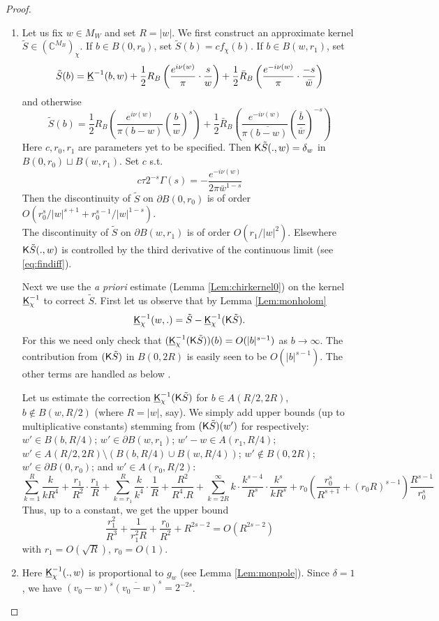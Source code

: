 \documentclass[10pt]{article}
\newcommand{\C}{\mathbb{C}}
\newcommand{\rK}{{\sf K}}
\newcommand{\uK}{{\underline {\sf K}}}
\begin{document}
\begin{proof}
\begin{enumerate}
\item
Let us fix $w\in M_W$ and set $R=|w|$. We first construct an approximate kernel $\tilde S\in(\C^{M_B})_\chi$. If $b\in B(0,r_0)$, set $\tilde S(b)=cf_\chi(b)$. If $b\in B(w,r_1)$, set 
$$\tilde S(b)=\uK^{-1}(b,w)+
\frac 12R_B\left(\frac{e^{i\nu(w)}}{\pi}\cdot\frac sw\right)+\frac 12\bar R_B\left(\frac{e^{-i\nu(w)}}{\pi}\cdot\frac{-s}{\bar w}\right)$$
and otherwise
$$\tilde S(b)=\frac 12R_B\left(\frac{e^{i\nu(w)}}{\pi(b-w)}\left(\frac bw\right)^s\right)+\frac 12\bar R_B\left(\frac{e^{-i\nu(w)}}{\pi\overline{(b-w)}}\left(\frac {\bar b}{\bar w}\right)^{-s}\right)$$
Here $c,r_0,r_1$ are parameters yet to be specified. Then $\rK \tilde S(.,w)=\delta_w$ in $B(0,r_0)\sqcup B(w,r_1)$. Set $c$ s.t.
$$c\tau 2^{-s}\Gamma(s)=-\frac {e^{-i\nu(w)}}{2\pi \bar w^{1-s}}$$
Then the discontinuity of $\tilde S$ on $\partial B(0,r_0)$ is of order $O(r_0^s/|w|^{s+1}+r_0^{s-1}/|w|^{1-s})$.\\
The discontinuity of $\tilde S$ on $\partial B(w,r_1)$ is of order $O(r_1/|w|^2)$. Elsewhere $\rK\tilde S(.,w)$ is controlled by the third derivative of the continuous limit (see \eqref{eq:findiff}).

Next we use the {\em a priori} estimate (Lemma \ref{Lem:chirkernel0}) on the kernel $\uK_\chi^{-1}$ to correct $\tilde S$. 
%
%
%
%
%
%
%
First let us observe that by Lemma \ref{Lem:monholom}
$$\uK_\chi^{-1}(w,.)=\tilde S-\uK_\chi^{-1}(\rK\tilde S).$$ 
For this we need only check that $(\uK_\chi^{-1}(\rK\tilde S))(b)=O(|b|^{s-1})$ as $b\rightarrow\infty$. The contribution from $(\rK\tilde S)$ in $B(0,2R)$ is easily seen to be $O(|b|^{s-1})$. The other terms are handled as below .


Let us estimate the correction $\uK_\chi^{-1}(\rK\tilde S)$ for $b\in A(R/2,2R)$, $b\notin B(w,R/2)$ (where $R=|w|$, say). We simply add upper bounds (up to multiplicative constants) stemming from $(\rK\tilde S)(w')$ for respectively: $w'\in B(b,R/4)$; $w'\in \partial B(w,r_1)$; $w'-w\in A(r_1,R/4)$;  $w'\in A(R/2,2R)\setminus(B(b,R/4)\cup B(w,R/4))$; $w'\notin B(0,2R)$; $w'\in\partial B(0,r_0)$; and $w'\in A(r_0,R/2)$:
 $$\sum_{k=1}^R\frac{k}{kR^4}+\frac{r_1}{R^2}\cdot\frac{r_1}R+\sum_{k=r_1}^R\frac{k}{k^4}\cdot\frac 1R+\frac{R^2}{R^4.R}+\sum_{k=2R}^\infty k\cdot\frac{k^{s-4}}{R^s}\cdot\frac{k^s}{kR^s}+r_0(\frac{r_0^s}{R^{s+1}}+(r_0R)^{s-1})\frac{R^{s-1}}{r_0^s}
 $$
 Thus, up to a constant, we get the upper bound
 $$\frac{r_1^2}{R^3}+\frac 1{r_1^2R}+\frac{r_0}{R^2}+R^{2s-2}=O(R^{2s-2})$$
with $r_1=O(\sqrt R)$, $r_0=O(1)$. 
 
 \item Here $\uK_\chi^{-1}(.,w)$ is proportional to $g_w$ (see Lemma \ref{Lem:monpole}). Since $\delta=1$, we have $(v_0-w)^s\overline{(v_0-w)}^s=2^{-2s}$.
\end{enumerate} 
\end{proof}
\end{document}
